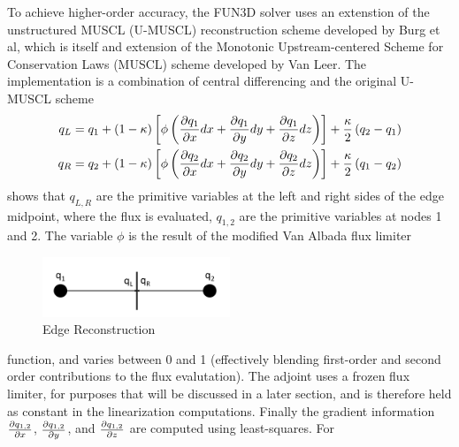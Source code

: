To achieve higher-order accuracy, the FUN3D solver uses an extenstion of the
unstructured MUSCL (U-MUSCL) reconstruction scheme developed by Burg et
al\cite{burg2005higher,burg2003verification}, which is itself and extension of
the Monotonic Upstream-centered Scheme for Conservation Laws (MUSCL) scheme
developed by Van Leer\cite{van1979towards}.  The implementation is a combination
of central differencing and the original U-MUSCL scheme
\begin{equation}
  \begin{aligned}
    q_L &= q_1 + (1-\kappa)\left[ \phi\left( \frac{\partial q_1}{\partial x}dx + \frac{\partial q_1}{\partial y}dy +
    \frac{\partial q_1}{\partial z}dz \right) \right] + \frac{\kappa}{2}\left( q_2 - q_1 \right) \\
    q_R &= q_2 + (1-\kappa)\left[ \phi\left( \frac{\partial q_2}{\partial x}dx + \frac{\partial q_2}{\partial y}dy +
    \frac{\partial q_2}{\partial z}dz \right) \right] + \frac{\kappa}{2}\left( q_1 - q_2 \right)
  \end{aligned}
  \label{u-muscl}
\end{equation}
 shows that $q_{L,R}$ are the primitive variables at the
left and right sides of the edge midpoint, where the flux is evaluated,
$q_{1,2}$ are the primitive variables at nodes 1 and 2.  The variable $\phi$ is
the result of the modified Van Albada flux limiter
\begin{figure}[h]
  \centering
  \includegraphics[width=0.5\textwidth]{figures/edge_reconstruction.png}
  \caption{Edge Reconstruction}
  \label{fig:edge-recons}
\end{figure}
function\cite{van1997comparative}, and varies between 0 and 1 (effectively
blending first-order and second order contributions to the flux evalutation).
The adjoint uses a frozen flux limiter, for purposes that will be discussed in a
later section, and is therefore held as constant in the linearization
computations.  Finally the gradient information $\frac{\partial q_{1,2}}{\partial x}$,
$\frac{\partial q_{1,2}}{\partial y}$, and $\frac{\partial q_{1,2}}{\partial z}$ are computed using least-squares.  For
